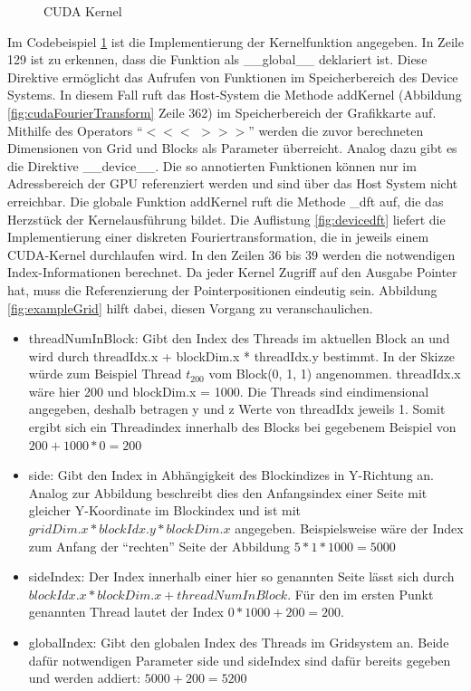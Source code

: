 \begin{figure}[h!]
	
	
	\caption{CUDA Kernel}
	\label{fig:cudaKernel}
\end{figure}

Im Codebeispiel \ref{fig:cudaKernel} ist die Implementierung der Kernelfunktion angegeben. In Zeile 129 ist zu erkennen, dass die Funktion als \_\_global\_\_ deklariert ist. Diese Direktive ermöglicht das Aufrufen von Funktionen im Speicherbereich des Device Systems. In diesem Fall ruft das Host-System die Methode addKernel (Abbildung \ref{fig:cudaFourierTransform} Zeile 362) im Speicherbereich der Grafikkarte auf. Mithilfe des Operators \enquote{$<<<$ $>>>$} werden die zuvor berechneten Dimensionen von Grid und Blocks als Parameter überreicht. Analog dazu gibt es die Direktive \_\_device\_\_. Die so annotierten Funktionen können nur im Adressbereich der GPU referenziert werden und sind über das Host System nicht erreichbar. Die globale Funktion addKernel ruft die Methode \_dft auf, die das Herzstück der Kernelausführung bildet. Die Auflistung \ref{fig:devicedft} liefert die Implementierung einer diskreten Fouriertransformation, die in jeweils einem CUDA-Kernel durchlaufen wird. In den Zeilen 36 bis 39 werden die notwendigen Index-Informationen berechnet. Da jeder Kernel Zugriff auf den Ausgabe Pointer hat, muss die Referenzierung der Pointerpositionen eindeutig sein. Abbildung \ref{fig:exampleGrid} hilft dabei, diesen Vorgang zu veranschaulichen.
\begin{itemize}
	\item threadNumInBlock: Gibt den Index des Threads im aktuellen Block an und wird durch threadIdx.x + blockDim.x * threadIdx.y bestimmt. In der Skizze würde zum Beispiel Thread $t_{200}$ vom Block(0, 1, 1) angenommen. threadIdx.x wäre hier 200 und blockDim.x = 1000. Die Threads sind eindimensional angegeben, deshalb betragen y und z Werte von threadIdx jeweils 1.
	Somit ergibt sich ein Threadindex innerhalb des Blocks bei gegebenem Beispiel von $200 + 1000 * 0 = 200$
	\item side: Gibt den Index in Abhängigkeit des Blockindizes in Y-Richtung an. Analog zur Abbildung beschreibt dies den Anfangsindex einer Seite mit gleicher Y-Koordinate im Blockindex und ist mit $gridDim.x * blockIdx.y * blockDim.x$ angegeben. Beispielsweise wäre der Index zum Anfang der \enquote{rechten} Seite der Abbildung $5 * 1 * 1000 = 5000$
	\item sideIndex: Der Index innerhalb einer hier so genannten Seite lässt sich durch $blockIdx.x * blockDim.x + threadNumInBlock$. Für den im ersten Punkt genannten Thread lautet der Index $0 * 1000 + 200 = 200$.
	\item globalIndex: Gibt den globalen Index des Threads im Gridsystem an. Beide dafür notwendigen Parameter side und sideIndex sind dafür bereits gegeben und werden addiert:
	$5000 + 200 = 5200$
\end{itemize}

